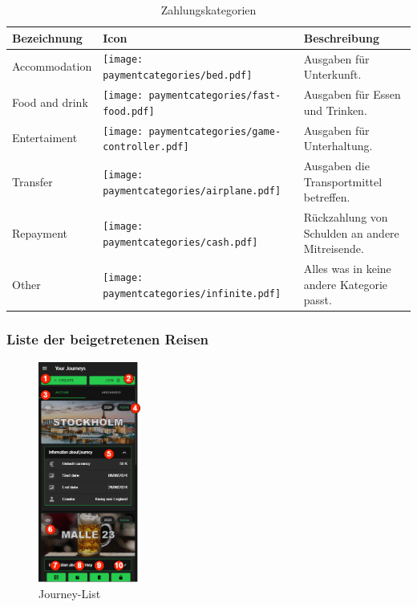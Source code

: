 \begin{table}[H]
	\caption{Zahlungskategorien}
	\begin{tabularx}{0.95\textwidth}{ |X|X|X| }
		\hline
		\rowcolor{gray} \textbf{Bezeichnung} & \textbf{Icon}                                                                 & Beschreibung                                    \\
		\hline
		Accommodation                        & \texttt{[image: paymentcategories/bed.pdf]}             &
		Ausgaben für Unterkunft.                                                                                                                                               \\
		\hline
		Food and drink                          & \texttt{[image: paymentcategories/fast-food.pdf]}       & Ausgaben für Essen und Trinken.                 \\
		\hline
		Entertaiment                         & \texttt{[image: paymentcategories/game-controller.pdf]} & Ausgaben für Unterhaltung.                      \\
		\hline
		Transfer                             & \texttt{[image: paymentcategories/airplane.pdf]}        & Ausgaben die Transportmittel betreffen.         \\
		\hline
		Repayment                            & \texttt{[image: paymentcategories/cash.pdf]}            & Rückzahlung von Schulden an andere Mitreisende. \\
		\hline
		Other                                & \texttt{[image: paymentcategories/infinite.pdf]}        & Alles was in keine andere Kategorie passt.      \\
		\hline
	\end{tabularx}
	\label{Tab:paymentcategories}
\end{table}

\subsubsection{Liste der beigetretenen Reisen}\label{Journey-List}
\begin{figure}[H]
	\centering
	\includegraphics[width=0.3\textwidth]{img/pages_numbers/journey-list.drawio}
	\caption[Journey-List]{Journey-List}
	\label{fig:Journey-List}
\end{figure}

